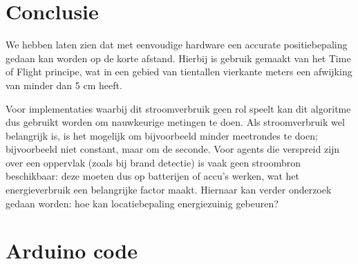 \documentclass[a4paper,10pt]{article}
\begin{document}
\section{Conclusie}\label{sec:conclusie}
We hebben laten zien dat met eenvoudige hardware een accurate positiebepaling gedaan kan worden op de korte afstand. Hierbij is gebruik gemaakt van het Time of Flight principe, wat in een gebied van tientallen vierkante meters een afwijking van minder dan 5 cm heeft.

Voor implementaties waarbij dit stroomverbruik geen rol speelt kan dit algoritme dus gebruikt worden om nauwkeurige metingen te doen. Als stroomverbruik wel belangrijk is, is het mogelijk om bijvoorbeeld minder meetrondes te doen; bijvoorbeeld niet constant, maar om de seconde. Voor agents die verspreid zijn over een oppervlak (zoals bij brand detectie) is vaak geen stroombron beschikbaar: deze moeten dus op batterijen of accu's werken, wat het energieverbruik een belangrijke factor maakt. Hiernaar kan verder onderzoek gedaan worden: hoe kan locatiebepaling energiezuinig gebeuren?
    



\newpage
\appendix
\section{Arduino code}
\label{sec:code}

\end{document}
